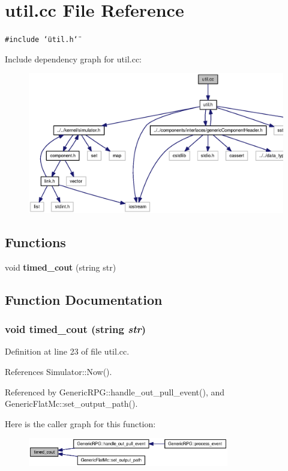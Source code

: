 \section{util.cc File Reference}
\label{util_8cc}
{\tt \#include \char`\"{}util.h\char`\"{}}\par


Include dependency graph for util.cc:\nopagebreak
\begin{figure}[H]
\begin{center}
\leavevmode
\includegraphics[width=420pt]{util_8cc__incl}
\end{center}
\end{figure}
\subsection*{Functions}
\begin{CompactItemize}
\item 
void {\bf timed\_\-cout} (string str)
\end{CompactItemize}


\subsection{Function Documentation}
\subsubsection[{timed\_\-cout}]{\setlength{\rightskip}{0pt plus 5cm}void timed\_\-cout (string {\em str})}\label{util_8cc_06d48ba68bdaae826fc87c1db842228e}




Definition at line 23 of file util.cc.

References Simulator::Now().

Referenced by GenericRPG::handle\_\-out\_\-pull\_\-event(), and GenericFlatMc::set\_\-output\_\-path().

Here is the caller graph for this function:\nopagebreak
\begin{figure}[H]
\begin{center}
\leavevmode
\includegraphics[width=248pt]{util_8cc_06d48ba68bdaae826fc87c1db842228e_icgraph}
\end{center}
\end{figure}
